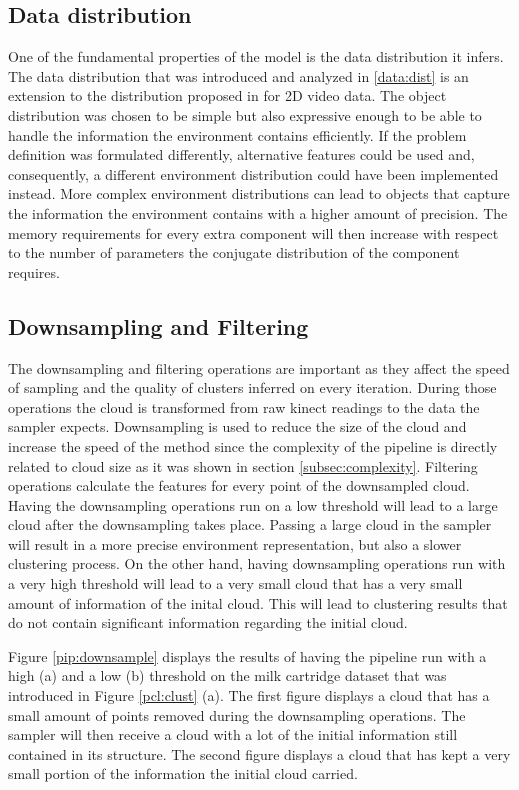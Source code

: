 \documentclass [twoside,hidelinks]{article}
\begin{document}
 
\subsection{Data distribution}

One of the fundamental properties of the model is the data distribution it infers. 
The data distribution that was introduced and analyzed in \ref{data:dist}  is an extension to the distribution proposed in \cite{dependentDiri} for 2D video data.
The object distribution was chosen to be simple but also expressive enough to be able to handle the information the environment contains efficiently.
If the problem definition was formulated differently, alternative features could be used and, consequently, a different environment distribution could have been implemented instead.
More complex environment distributions can lead to objects that capture the information the environment contains with a higher amount of precision. 
The memory requirements for every extra component will then increase with respect to the number of parameters the conjugate distribution of the component requires. 
 
\subsection{Downsampling and Filtering}

The downsampling and filtering operations are important as they affect the speed of sampling and the quality of clusters inferred on every iteration. 
During those operations the cloud is transformed from raw kinect readings to the data the sampler expects.
Downsampling is used to reduce the size of the cloud and increase the speed of the method since the complexity of the pipeline is directly related to cloud size as it was shown in section \ref{subsec:complexity}. Filtering operations calculate the features for every point of the downsampled cloud.
Having the downsampling operations run on a low threshold will lead to a large cloud after the downsampling takes place. 
Passing a large cloud in the sampler will result in a more precise environment representation, but also a slower clustering process.
On the other hand, having downsampling operations run with a very high threshold will lead to a very small cloud that has a very small amount of information of the inital cloud. This will lead to clustering results that do not contain significant information regarding the initial cloud.

Figure \ref{pip:downsample} displays the results of having the pipeline run with a high (a) and a low (b) threshold on the milk cartridge dataset that was introduced in Figure \ref{pcl:clust} (a).
The first figure displays a cloud that has a small amount of points removed during the downsampling operations. The sampler will then receive a cloud with a lot of the initial information still contained in its structure.
The second figure displays a cloud that has kept a very small portion of the information the initial cloud carried.
\end{document}
